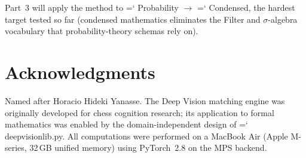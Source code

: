 \documentclass[11pt]{article}
\renewcommand{\texttt}[1]{%
  \begingroup\ttfamily\hyphenchar\font=`\-\relax
  \def\_{\textunderscore\discretionary{}{}{}}%
  #1\endgroup}
\theoremstyle{definition}
\theoremstyle{remark}
\begin{document}
Part~3 will apply the method to \texttt{Probability} $\to$
\texttt{Condensed}, the hardest target tested so far (condensed
mathematics eliminates the Filter and $\sigma$-algebra vocabulary that
probability-theory schemas rely on).

\section*{Acknowledgments}

Named after Horacio Hideki Yanasse.  The Deep Vision matching engine
was originally developed for chess cognition research; its application
to formal mathematics was enabled by the domain-independent design of
\texttt{deep\_vision\_lib.py}.  All computations were performed on a
MacBook Air (Apple M-series, 32\,GB unified memory) using PyTorch~2.8
on the MPS backend.
\end{document}
